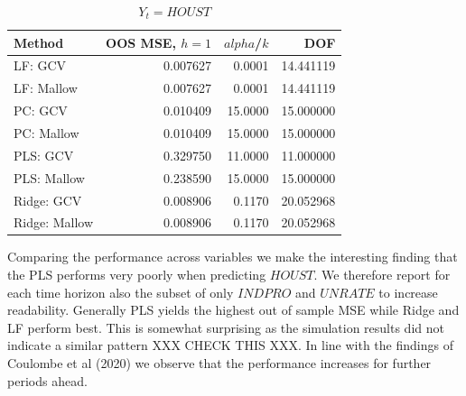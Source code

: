 \begin{table}[h!]
\centering
\caption{$Y_t = HOUST$}
\label{tab::houst}
\begin{tabular}{lrrr}
\toprule
       Method &  OOS MSE, $h =1$ &  $alpha$/$k$ &  DOF \\
\midrule
      LF: GCV & 0.007627 &   0.0001 & 14.441119 \\
   LF: Mallow & 0.007627 &   0.0001 & 14.441119 \\
      PC: GCV & 0.010409 &  15.0000 & 15.000000 \\
   PC: Mallow & 0.010409 &  15.0000 & 15.000000 \\
     PLS: GCV & 0.329750 &  11.0000 & 11.000000 \\
  PLS: Mallow & 0.238590 &  15.0000 & 15.000000 \\
   Ridge: GCV & 0.008906 &   0.1170 & 20.052968 \\
Ridge: Mallow & 0.008906 &   0.1170 & 20.052968 \\
\bottomrule
\end{tabular}
\end{table}

Comparing the performance across variables we make the interesting finding that the PLS performs very poorly when predicting $HOUST$. We therefore report for each time horizon also the subset of only $INDPRO$ and $UNRATE$ to increase readability. Generally PLS yields the highest out of sample MSE while Ridge and LF perform best. This is somewhat surprising as the simulation results did not indicate a similar pattern XXX CHECK THIS XXX. 
In line with the findings of Coulombe et al (2020) we observe that the performance increases for further periods ahead.


